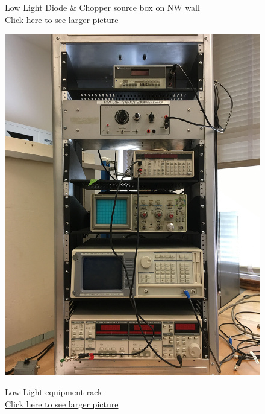 \documentclass{../lab}
\begin{document}
\begin{figure}[H]
  \caption{Low Light Diode \& Chopper source box on NW wall \\
  \href{http://experimentationlab.berkeley.edu/sites/default/files/images/LLS-Source_3439.jpg}{Click here to see larger picture}}
  \label{fig:LLS-Source_3439.jpg}
\endminipage\hfill
{}
  \href{http://experimentationlab.berkeley.edu/sites/default/files/IMG_4088.JPG}{\includegraphics[width=\linewidth,keepaspectratio]{images/IMG_4088.JPG}}
  \caption{Low Light equipment rack \\ \href{http://experimentationlab.berkeley.edu/sites/default/files/IMG_4088.JPG}{Click here to see larger picture}}
  \label{fig:PigCollimator}
\endminipage
\end{figure}
\end{document}
